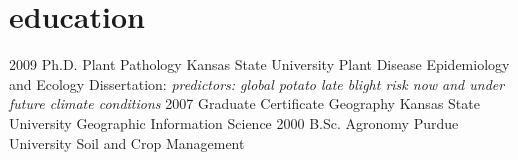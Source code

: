 \section{education}

\begin{entrylist}
  \entry
    {2009}
    {Ph.D. {\normalfont Plant Pathology}}
    {Kansas State University}
    {Plant Disease Epidemiology and Ecology}
  \entry
    {}
    {Dissertation: }
    {}
    {\emph{predictors: global potato late blight risk now and under future climate conditions}}
 \entry
    {2007}
    {Graduate Certificate {\normalfont Geography}}
    {Kansas State University}
    {Geographic Information Science}
  \entry
    {2000}
    {B.Sc. {\normalfont Agronomy}}
    {Purdue University}
    {Soil and Crop Management}
\end{entrylist}
